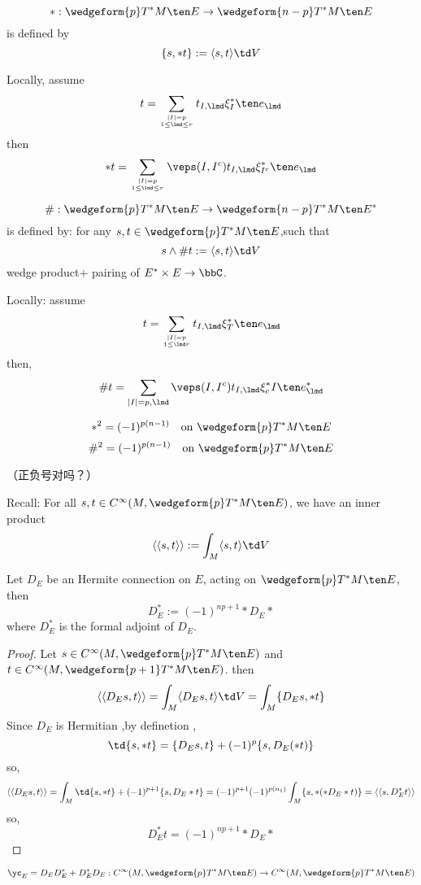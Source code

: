 \begin{definition}
$$*:\wedgeform{p}T^*M\ten E\to\wedgeform{n-p}T^*M\ten E$$
is defined by
$$\{s,*t\}:=\langle s,t\rangle\td V$$
\end{definition}

Locally, assume
$$t=\sum_{|I|=p\atop1\leq\lmd\leq r}
t_{I,\lmd}\xi_I^*\ten e_{\lmd}
$$
then
$$
  *t=
  \sum_{|I|=p\atop 1\leq\lmd\leq r}
  \veps(I,I^c)
  t_{I,\lmd}\xi_{I^c}^*\ten e_{\lmd}
$$

\begin{definition}
$$\#:\wedgeform{p}T^*M\ten E\to\wedgeform{n-p}T^*M\ten E^*$$
is defined by: for any $s,t\in \wedgeform{p}T^*M\ten E$,such that
$$s\wedge\# t:=\langle s,t\rangle\td V$$
wedge product$+$ pairing of $E^*\times E\to\bbC$.
\end{definition}
Locally: assume
$$t=\sum_{|I|=p\atop 1\leq\lmd r}
t_{I,\lmd}\xi_T^*\ten e_{\lmd}
$$
then,
$$\#t=\sum_{|I|=p,\lmd}
\veps(I,I^c)t_{I,\lmd}\xi_c^*I\ten e_\lmd^*
$$

\begin{prop}
$$*^2=(-1)^{p(n-1)}\quad\text{on } \wedgeform{p}T^*M\ten E$$
$$\#^2=(-1)^{p(n-1)}\quad\text{on } \wedgeform{p}T^*M\ten E$$
\end{prop}
（正负号对吗？）

Recall: For all $s,t\in C^\infty(M,\wedgeform{p}T^*M\ten E)$,
we have an inner product
$$\langle\langle s,t\rangle\rangle
:=\int_M\langle s,t\rangle\td V
$$

\begin{thm}
Let $D_E$ be an Hermite connection on $E$,
acting on $\wedgeform{p}T^*M\ten E$, then
$$D_E^*:=(-1)^{np+1}*D_E*$$
where $D^*_E$ is the formal adjoint of $D_E$.
\end{thm}

\begin{proof}
Let $s\in C^\infty(M,\wedgeform{p}T^*M\ten E)$ and
$t\in C^\infty(M,\wedgeform{p+1}T^*M\ten E)$. then
$$
  \langle\langle D_Es,t\rangle\rangle
 =\int_M
    \langle
      D_Es,t
    \rangle
    \td V
 =
  \int_M
    \{D_Es,*t\}
$$
Since $D_E$ is Hermitian ,by definetion ,
$$\td\{s,*t\}=\{D_Es,t\}+(-1)^p\{s,D_E(*t)\}$$
so,
$$
  \langle\langle D_Es,t\rangle\rangle
=
  \int_M\td\{s,*t\}
  +(-1)^{p+1}
   \{s,D_E*t\}
=
  (-1)^{p+1}(-1)^{p(n_1)}
  \int_M
    \{s,*(*D_E*t)\}
=
  \langle\langle s,D_E^*t\rangle\rangle
$$
so,
$$D_E^*t=(-1)^{np+1}*D_E*$$
\end{proof}

\begin{definition}
$$\yc_E=D_ED_E^*+D_E^*D_E:
C^\infty(M,\wedgeform{p}T^*M\ten E)
\to
C^\infty(M,\wedgeform{p}T^*M\ten E)
$$
\end{definition}

